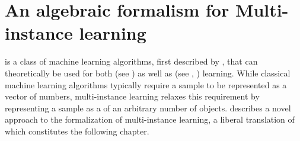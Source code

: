 \chapter{An algebraic formalism for Multi-instance learning}

 is a class of machine learning algorithms, first described by \cite{dietterich_solving_1997}, that can theoretically be used for both  (see \cite{amores_multiple_2013}) as well as  (see \cite{zhang_multi-instance_2009}, \cite{chen_contextual_2012}) learning. While classical machine learning algorithms typically require a sample to be represented as a vector of numbers, multi-instance learning relaxes this requirement by representing a sample as a  of an arbitrary number of objects. \cite{dedic_hierarchicke_2017} describes a novel approach to the formalization of multi-instance learning, a liberal translation of which constitutes the following chapter.

